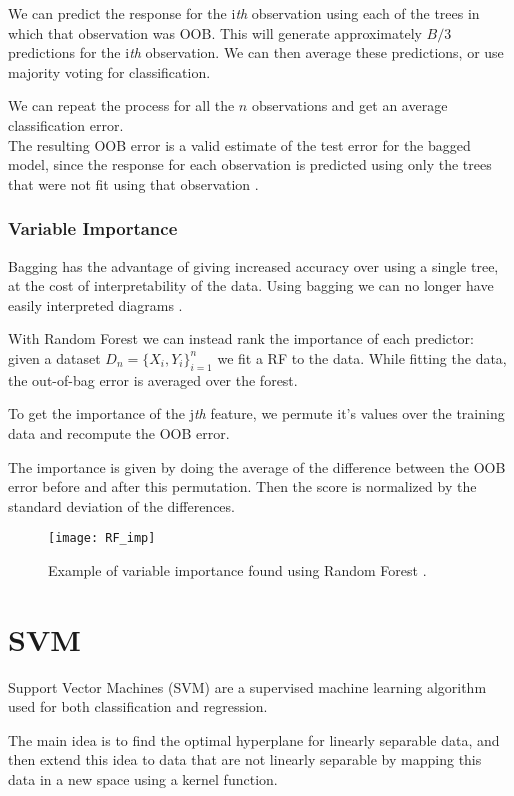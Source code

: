 We can predict the response for the i\textit{th} observation using each of the trees in which that observation was OOB. This will generate approximately $B/3$ predictions for the i\textit{th} observation.
We can then average these predictions, or use majority voting for classification.

We can repeat the process for all the $n$ observations and get an average classification error. \\
The resulting OOB error is a valid estimate of the test error for the bagged model, since the response for each observation is predicted using only the trees that were not fit using that observation \cite{ISLR}. 

\subsubsection{Variable Importance}
Bagging has the advantage of giving increased accuracy over using a single tree, at the cost of interpretability of the data. Using bagging we can no longer have easily interpreted diagrams \cite{ISLR}.

With Random Forest we can instead rank the importance of each predictor: \\
given a dataset $D_n = \{X_i, Y_i\}_{i=1}^n$ we fit a RF to the data. While fitting the data, the out-of-bag error is averaged over the forest. 

To get the importance of the j\textit{th} feature, we permute it's values over the training data and recompute the OOB error.

The importance is given by doing the average of the difference between the OOB error before and after this permutation. Then the score is normalized by the standard deviation of the differences.

\begin{figure}[H]
	\centering
	\texttt{[image: RF\_imp]}
	\caption{Example of variable importance found using Random Forest \cite{rf_imp}.}
	\label{fig:RF_imp}
\end{figure}

\clearpage

\section{SVM} \label{svm}
Support Vector Machines (SVM) are a supervised machine learning algorithm used for both classification and regression.

The main idea is to find the optimal hyperplane for linearly separable data, and then extend this idea to data that are not linearly separable by mapping this data in a new space using a kernel function.

